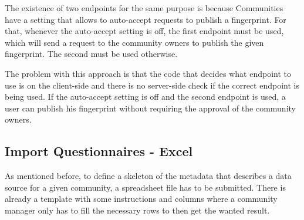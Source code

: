 The existence of two endpoints for the same purpose is because Communities have a setting that allows to auto-accept requests to publish a fingerprint.
For that, whenever the auto-accept setting is off, the first endpoint must be used, which will send a request to the community owners to publish the given fingerprint.
The second must be used otherwise.

The problem with this approach is that the code that decides what endpoint to use is on the client-side and there is no server-side check if the correct endpoint is being used.
If the auto-accept setting is off and the second endpoint is used, a user can publish his fingerprint without requiring the approval of the community owners.

\subsection{Import Questionnaires - Excel}
\label{subsection:excel}

As mentioned before, to define a skeleton of the metadata that describes a data source for a given community, a spreadsheet file has to be submitted.
There is already a template with some instructions and columns where a community manager only has to fill the necessary rows to then get the wanted result.

